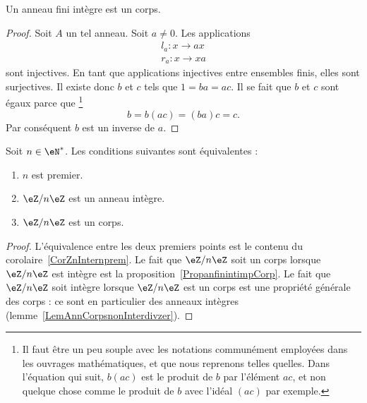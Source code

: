 \begin{proposition}     \label{PropanfinintimpCorp}
    Un anneau fini intègre est un corps.
\end{proposition}

\begin{proof}
    Soit \( A\) un tel anneau. Soit \( a\neq 0\). Les applications
    \begin{subequations}
        \begin{align}
            l_a\colon x\to ax\\
            r_a\colon x\to xa
        \end{align}
    \end{subequations}
    sont injectives. En tant que applications injectives entre ensembles finis, elles sont surjectives. Il existe donc \( b\) et \( c\) tels que \( 1=ba=ac\). Il se fait que \( b\) et \( c\) sont égaux parce que
    \footnote{Il faut être un peu souple avec les notations communément employées dans les ouvrages mathématiques, et que nous reprenons telles quelles. Dans l'équation qui suit, \( b(ac)\) est le produit de \( b\) par l'élément \( ac\), et non quelque chose comme le produit de \( b\) avec l'idéal \( (ac)\) par exemple.}
    \begin{equation}
        b=b(ac)=(ba)c=c.
    \end{equation}
    Par conséquent \( b\) est un inverse de \( a\).
\end{proof}

\begin{proposition}     \label{PropzhFgNJ}
    Soit \( n\in\eN^*\). Les conditions suivantes sont équivalentes :
    \begin{enumerate}
        \item
            \( n\) est premier.
        \item
            \( \eZ/n\eZ\) est un anneau intègre.
        \item
            \( \eZ/n\eZ\) est un corps.
    \end{enumerate}
\end{proposition}

\begin{proof}
    L'équivalence entre les deux premiers points est le contenu du corolaire~\ref{CorZnInternprem}. Le fait que \( \eZ/n\eZ\) soit un corps lorsque \( \eZ/n\eZ\) est intègre est la proposition~\ref{PropanfinintimpCorp}. Le fait que \( \eZ/n\eZ\) soit intègre lorsque \( \eZ/n\eZ\) est un corps est une propriété générale des corps : ce sont en particulier des anneaux intègres (lemme~\ref{LemAnnCorpsnonInterdivzer}).
\end{proof}

